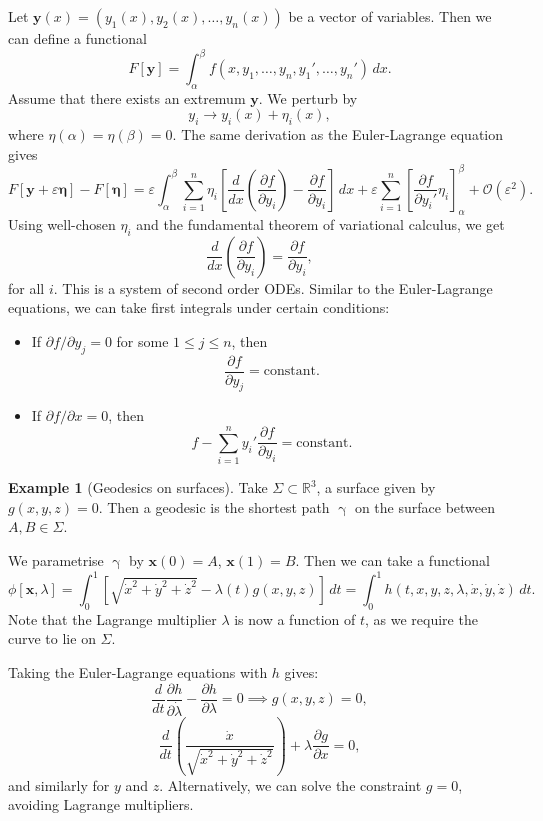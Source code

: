 \documentclass[12pt]{article}
\theoremstyle{definition}
\newtheorem{example}{Example}[section]
\theoremstyle{remark}
\begin{document}
Let $\mathbf{y}(x) = (y_1(x), y_2(x), \ldots, y_n(x))$ be a vector of variables. Then we can define a functional
\[
	F[\mathbf{y}] = \int_{\alpha}^{\beta} f(x, y_1, \ldots, y_n, y_1', \ldots, y_n')\, dx
.\]
Assume that there exists an extremum $\mathbf{y}$. We perturb by
\[
	y_i \to y_i(x) + \eta_i(x)
,\]
where $\eta(\alpha) = \eta(\beta) = 0$. The same derivation as the Euler-Lagrange equation gives
\[
	F[\mathbf{y} + \varepsilon \bm{\eta}] - F[\bm{\eta}] = \varepsilon \int_{\alpha}^{\beta} \sum_{i = 1}^{n} \eta_i \left[ \frac{d}{dx} \left( \frac{\partial f}{\partial y_i} \right) - \frac{\partial f}{\partial y_i} \right] \, dx + \varepsilon \sum_{i = 1}^{n} \left[ \frac{\partial f}{\partial y_i'} \eta_i \right]_{\alpha}^{\beta} + \mathcal{O}(\varepsilon^2)
.\]
Using well-chosen $\eta_i$ and the fundamental theorem of variational calculus, we get
\[
	\frac{d}{dx} \left(\frac{\partial f}{\partial y_i} \right) = \frac{\partial f}{\partial y_i} \tag{3.3}\label{eq:el-e2}
,\]
for all $i$. This is a system of second order ODEs.
\newpage
Similar to the Euler-Lagrange equations, we can take first integrals under certain conditions:
\begin{itemize}
	\item If $\partial f/\partial y_j = 0$ for some $1 \leq j \leq n$, then
		\[
			\frac{\partial f}{\partial y_j} = \text{constant}
		.\]
	\item If $\partial f/\partial x = 0$, then
		\[
			f - \sum_{i = 1}^{n} y_i' \frac{\partial f}{\partial y_i} = \text{constant}
		.\]
\end{itemize}

\begin{adjustbox}{minipage = \columnwidth - 25.5pt, margin=1em, frame=1pt, margin=0em}
\begin{example}[Geodesics on surfaces]
	Take $\Sigma \subset \mathbb{R}^3$, a surface given by $g(x, y, z) = 0$. Then a geodesic is the shortest path $\upgamma$ on the surface between $A, B \in \Sigma$.

	We parametrise $\upgamma$ by $\mathbf{x}(0) = A$, $\mathbf{x}(1) = B$. Then we can take a functional
	\[
		\phi[\mathbf{x}, \lambda] = \int_{0}^{1} \left[\sqrt{\dot x^2 + \dot y^2 + \dot z^2} - \lambda(t) g(x, y, z)\right]\, dt = \int_{0}^{1} h(t, x, y, z, \lambda, \dot x, \dot y, \dot z) \, dt
	.\]
	Note that the Lagrange multiplier $\lambda$ is now a function of $t$, as we require the curve to lie on $\Sigma$. 

	Taking the Euler-Lagrange equations with $h$ gives:
	\[
		\frac{d}{dt} \frac{\partial h}{\partial \dot \lambda} - \frac{\partial h}{\partial \lambda} = 0 \implies g(x, y, z) = 0
	,\]
	\[
		\frac{d}{dt} \left( \frac{\dot x}{\sqrt{\dot x^2 + \dot y^2 + \dot z^2}}\right) + \lambda \frac{\partial g}{\partial x} = 0
	,\]
	and similarly for $y$ and $z$. Alternatively, we can solve the constraint $g = 0$, avoiding Lagrange multipliers.
\end{example}

\end{adjustbox}
\end{document}
